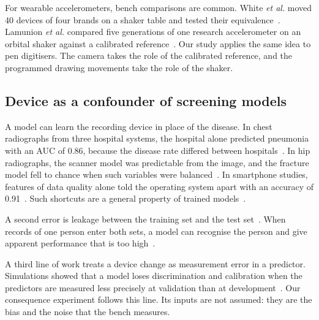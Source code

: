 For wearable accelerometers, bench comparisons are common.
White \emph{et al.} moved 40 devices of four brands on a shaker table and tested their equivalence~\cite{White2024}.
Lamunion \emph{et al.} compared five generations of one research accelerometer on an orbital shaker against a calibrated reference~\cite{Lamunion2025}.
Our study applies the same idea to pen digitisers.
The camera takes the role of the calibrated reference, and the programmed drawing movements take the role of the shaker.

\subsection{Device as a confounder of screening models}
A model can learn the recording device in place of the disease.
In chest radiographs from three hospital systems, the hospital alone predicted pneumonia with an AUC of 0.86, because the disease rate differed between hospitals~\cite{Zech2018}.
In hip radiographs, the scanner model was predictable from the image, and the fracture model fell to chance when such variables were balanced~\cite{Badgeley2019}.
In smartphone studies, features of data quality alone told the operating system apart with an accuracy of 0.91~\cite{Halabi2024}.
Such shortcuts are a general property of trained models~\cite{Geirhos2020}.

A second error is leakage between the training set and the test set~\cite{Kapoor2023}.
When records of one person enter both sets, a model can recognise the person and give apparent performance that is too high~\cite{Saeb2017,ChaibubNeto2019}.

A third line of work treats a device change as measurement error in a predictor.
Simulations showed that a model loses discrimination and calibration when the predictors are measured less precisely at validation than at development~\cite{Luijken2019}.
Our consequence experiment follows this line.
Its inputs are not assumed: they are the bias and the noise that the bench measures.

